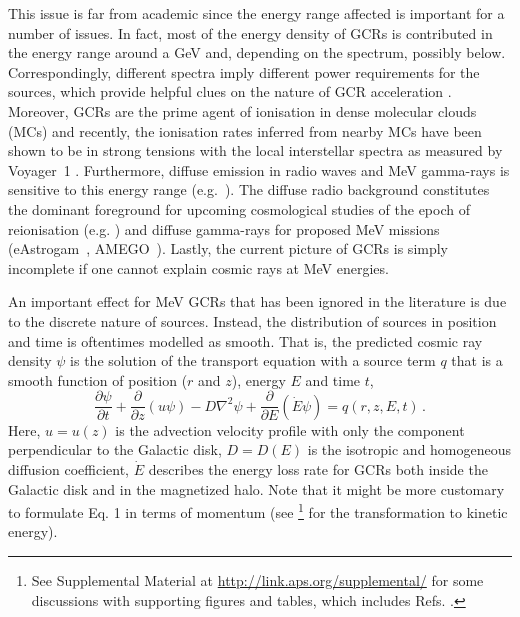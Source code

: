 \documentclass[%
reprint,
amsmath,amssymb,
aps,
superscriptaddress,
preprintnumbers
]{revtex4-2}
\begin{document}
This issue is far from academic since the energy range affected is important for a number of issues. 
In fact, most of the energy density of GCRs is contributed in the energy range around a GeV and, depending on the spectrum, possibly below.
Correspondingly, different spectra imply different power requirements for the sources, which provide helpful clues on the nature of GCR acceleration \cite{ginzburg1964,recchia2019}. Moreover, GCRs are the prime agent of ionisation in dense molecular clouds (MCs) and recently, the ionisation rates inferred from nearby MCs have been shown to be in strong tensions with the local interstellar spectra as measured by Voyager~1 \cite{phan2018,silsbee2019,padovani2020}. Furthermore, diffuse emission in radio waves and MeV gamma-rays is sensitive to this energy range (e.g.~\cite{orlando2018}). The diffuse radio background constitutes the dominant foreground for upcoming cosmological studies of the epoch of reionisation (e.g. \cite{Rao:2016xre}) and diffuse gamma-rays for proposed MeV missions (eAstrogam~\cite{DeAngelis:2016slk}, AMEGO~\cite{2019BAAS...51g.245M}). Lastly, the current picture of GCRs is simply incomplete if one cannot explain cosmic rays at MeV energies.

An important effect for MeV GCRs that has been ignored in the literature is due to the discrete nature of sources. Instead, the distribution of sources in position and time is oftentimes modelled as smooth. That is, the predicted cosmic ray density $\psi$ is the solution of the transport equation with a source term $q$ that is a smooth function of position ($r$ and $z$), energy $E$ and time $t$,
%
\begin{equation}
\frac{\partial \psi}{\partial t}+\frac{\partial}{\partial z}\left(u \psi \right) -D\nabla^2 \psi + \frac{\partial }{\partial E}\left(\dot{E}\psi\right)=q(r, z, E, t) \, . \label{eq:transport}
\end{equation}
%
Here, $u=u(z)$ is the advection velocity profile with only the component perpendicular to the Galactic disk, $D=D(E)$ is the isotropic and homogeneous diffusion coefficient, $\dot{E}$ describes the energy loss rate for GCRs both inside the Galactic disk and in the magnetized halo. Note that it might be more customary to formulate Eq. 1 in terms of momentum (see \footnote{See Supplemental Material at \url{http://link.aps.org/supplemental/} for some discussions with supporting figures and tables, which includes Refs. \cite{strong1998,schlickeiser1999,mertsch2020}.} for the transformation to kinetic energy).
\end{document}
